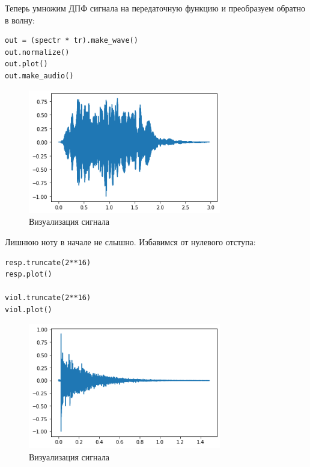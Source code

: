 \documentclass[a4paper,12pt]{report}
\begin{document}
Теперь умножим ДПФ сигнала на передаточную функцию и преобразуем обратно в волну:

\begin{lstlisting}[caption=Совмещение сигнала]
out = (spectr * tr).make_wave()
out.normalize()
out.plot()
out.make_audio()
\end{lstlisting}

\begin{figure}[H]
        \centering
        \includegraphics[width=0.75\textwidth]{4.png}
        \caption{Визуализация сигнала}
        \label{4}
\end{figure}

Лишнюю ноту в начале не слышно. Избавимся от нулевого отступа:

\begin{lstlisting}[caption=Избавление от нулевого отступа]
resp.truncate(2**16)
resp.plot()

viol.truncate(2**16)
viol.plot()
\end{lstlisting}

\begin{figure}[H]
        \centering
        \includegraphics[width=0.75\textwidth]{5.png}
        \caption{Визуализация сигнала}
        \label{5}
\end{figure}
\end{document}
